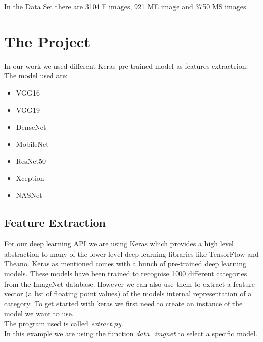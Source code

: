 \documentclass[12pt]{article} %
\begin{document}
In the Data Set there are 3104 F images, 921 ME image and 3750 MS images.

\newpage
\section{The Project}
In our work we used different Keras pre-trained model as features extractrion.\\
The model used are:
\begin{itemize}
\item VGG16
\item VGG19
\item DenseNet
\item MobileNet
\item ResNet50
\item Xception
\item NASNet
\end{itemize}

\subsection {Feature Extraction}
For our deep learning API we are using Keras which provides a high level abstraction to many of the lower level deep learning libraries like TensorFlow and Theano.
Keras as mentioned comes with a bunch of pre-trained deep learning models. These models have been trained to recognise 1000 different categories from the ImageNet database. 
However we can also use them to extract a feature vector (a list of floating point values) of the models internal representation of a category.
To get started with keras we first need to create an instance of the model we want to use.\\
The program used is called \textit{extract.py}.\\
 In this example we are using the function \textit{data\_imgnet} to select a specific model.

\begin{figure}[H] %
 \end{figure}
\end{document}
